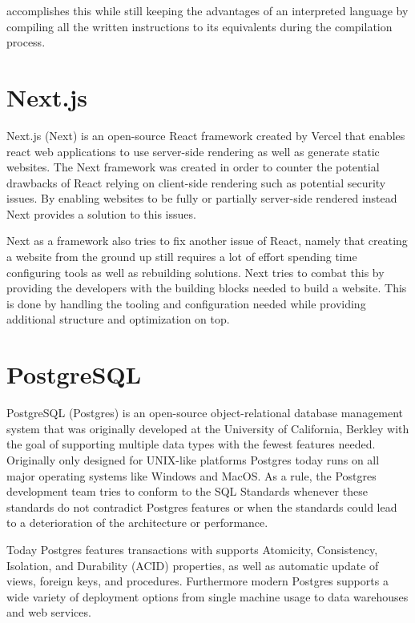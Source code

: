 \typescript{} accomplishes this while still keeping the advantages of an interpreted language by compiling all the written instructions to its \javascript{} equivalents during the compilation process.

\section{Next.js}
Next.js (Next) is an open-source React framework created by Vercel that enables react web applications to use server-side rendering as well as generate static websites. The Next framework was created in order to counter the potential drawbacks of React relying on client-side rendering such as potential security issues. By enabling websites to be fully or partially server-side rendered instead Next provides a solution to this issues\cite {Nextjs_Docks}. 

Next as a framework also tries to fix another issue of React, namely that creating a website from the ground up still requires a lot of effort spending time configuring tools as well as rebuilding solutions. 
Next tries to combat this by providing the developers with the building blocks needed to build a website.
This is done by handling the tooling and configuration needed while providing additional structure and optimization on top\cite{Nextjs_Docks}.


\section{PostgreSQL}
PostgreSQL (Postgres) is an open-source object-relational database management system that was originally developed at the University of California, Berkley with the goal of supporting multiple data types with the fewest features needed. Originally only designed for UNIX-like platforms Postgres today runs on all major operating systems like Windows and MacOS\cite{Postgres_Docs}.
As a rule, the Postgres development team tries to conform to the SQL Standards whenever these standards do not contradict Postgres features or when the standards could lead to a deterioration of the architecture or performance\cite{Postgres_Docs}. 

Today Postgres features transactions with supports Atomicity, Consistency, Isolation, and Durability (ACID) properties, as well as automatic update of views, foreign keys, and procedures. 
Furthermore modern Postgres supports a wide variety of deployment options from single machine usage to data warehouses and web services\cite{Postgres_Docs}.




